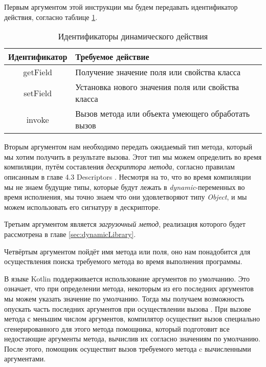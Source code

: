 
Первым аргументом этой инструкции мы будем передавать идентификатор действия, согласно таблице \ref{tab:DynamicCallType}. 

\begin{table}[h]
\caption{\label{tab:DynamicCallType}Идентификаторы динамического действия}
\begin{center}
\begin{tabular}{|c|l|}
\hline
Идентификатор	& Требуемое действие \\
\hline
getField & Получение значение поля или свойства класса  \\
setField & Установка нового значения поля или свойства класса	\\
invoke   & Вызов метода или объекта умеющего обработать вызов  \\
\hline
\end{tabular}
\end{center}
\end{table} 

Вторым аргументом нам необходимо передать ожидаемый тип метода, который мы хотим получить в результате вызова. Этот тип мы можем определить во время компиляции, путём составления \textit{дескриптора метода}, согласно правилам описанным в главе 4.3 Descriptors \cite{book:yellin1996java}. Несмотря на то, что во время компиляции мы не знаем будущие типы, которые будут лежать в \textit{dynamic}-переменных во время исполнения, мы точно знаем что они удовлетворяют типу \textit{Object}, и мы можем использовать его сигнатуру в дескрипторе.

Третьим аргументом является \textit{загрузочный метод}, реализация которого будет рассмотрена в главе \ref{sec:dynamicLibrary}.

Четвёртым аргументом пойдёт имя метода или поля, оно нам понадобится для осуществления поиска требуемого метода во время выполнения программы.

В языке Kotlin поддерживается использование аргументов по умолчанию. Это означает, что при определении метода, некоторым из его последних аргументов мы можем указать значение по умолчанию. Тогда мы получаем возможность опускать часть последних аргументов при осуществлении вызова \cite{book:jemerov2017kotlininAction}. При вызове метода с меньшим числом аргументов, компилятор осуществит вызов специально сгенерированного для этого метода помощника, который подготовит все недостающие аргументы метода, вычислив их согласно значениям по умолчанию. После этого, помощник осуществит вызов требуемого метода c вычисленными аргументами.

